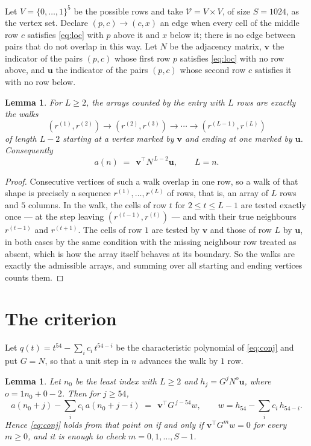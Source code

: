\documentclass[11pt,a4paper]{article}
\theoremstyle{plain}
\newtheorem{lemma}[theorem]{Lemma}
\theoremstyle{definition}
\begin{document}
Let $V=\{0,\dots,1\}^{5}$ be the possible rows and take
$\mathcal V=V\times V$, of size $S=1024$, as the vertex set. Declare $(p,c)\to(c,x)$ an edge
when every cell of the middle row $c$ satisfies \eqref{eq:loc} with $p$ above it and $x$
below it; there is no edge between pairs that do not overlap in this way. Let $N$ be the
adjacency matrix, $\mathbf{v}$ the indicator of the pairs $(p,c)$ whose first row $p$
satisfies \eqref{eq:loc} with no row above, and $\mathbf{u}$ the indicator of
the pairs $(p,c)$ whose second row $c$ satisfies it with no row below.

\begin{lemma}\label{lem:walk}
For $L\ge2$, the arrays counted by the entry with $L$ rows are exactly the walks
\[
(r^{(1)},r^{(2)})\to(r^{(2)},r^{(3)})\to\cdots\to(r^{(L-1)},r^{(L)})
\]
of length $L-2$ starting at a vertex marked by $\mathbf{v}$ and ending at one marked by
$\mathbf{u}$. Consequently
\[
a(n)\;=\;\,\mathbf{v}^{\!\top}N^{\,L-2}\mathbf{u},\qquad L=n .
\]
\end{lemma}

\begin{proof}
Consecutive vertices of such a walk overlap in one row, so a walk of that shape is
precisely a sequence $r^{(1)},\dots,r^{(L)}$ of rows, that is, an array of $L$ rows
and $5$ columns. In the walk, the cells of row $t$ for $2\le t\le L-1$ are tested
exactly once --- at the step leaving $(r^{(t-1)},r^{(t)})$ --- and with their true
neighbours $r^{(t-1)}$ and $r^{(t+1)}$. The cells of row $1$ are tested by
$\mathbf{v}$ and those of row $L$ by $\mathbf{u}$, in both cases by the same condition
with the missing neighbour row treated as absent, which is how the array itself behaves at
its boundary. So the walks are exactly the admissible arrays, and summing over all starting
and ending vertices counts them.
\end{proof}

\section{The criterion}

Let $q(t)=t^{54}-\sum_i c_i\,t^{54-i}$ be the characteristic polynomial of
\eqref{eq:conj} and put $G=N$, so that a unit step in $n$ advances the walk by
$1$ row.

\begin{lemma}\label{lem:crit}
Let $n_0$ be the least index with $L\ge2$ and $h_j=G^{j}N^{o}\mathbf{u}$, where
$o=1n_0+0-2$. Then for $j\ge54$,
\[
a(n_0+j)-\sum_i c_i\,a(n_0+j-i)\;=\;\,\mathbf{v}^{\!\top}G^{\,j-54}w,
\qquad w=h_{54}-\sum_i c_i\,h_{54-i} .
\]
Hence \eqref{eq:conj} holds from that point on if and only if
$\mathbf{v}^{\!\top}G^{m}w=0$ for every $m\ge0$, and it is enough to check
$m=0,1,\dots,S-1$.
\end{lemma}
\end{document}
